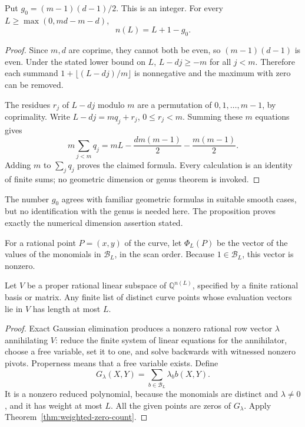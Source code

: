 \begin{proposition}\label{prop:weighted-dimension}
Put $g_0=(m-1)(d-1)/2$.  This is an integer.  For every
$L\ge\max(0,md-m-d)$,
\[
 n(L)=L+1-g_0.
\]
\end{proposition}

\begin{proof}
Since $m,d$ are coprime, they cannot both be even, so
$(m-1)(d-1)$ is even.  Under the stated lower bound on $L$,
$L-dj\ge -m$ for all $j<m$.  Therefore each summand
$1+\lfloor(L-dj)/m\rfloor$ is nonnegative and the maximum with zero
can be removed.

The residues $r_j$ of $L-dj$ modulo $m$ are a permutation of
$0,1,\ldots,m-1$, by coprimality.  Write
$L-dj=mq_j+r_j$, $0\le r_j<m$.  Summing these $m$ equations gives
\[
 m\sum_{j<m}q_j
   =mL-\frac{dm(m-1)}2-\frac{m(m-1)}2.
\]
Adding $m$ to $\sum_jq_j$ proves the claimed formula.
Every calculation is an identity of finite sums; no geometric dimension
or genus theorem is invoked.
\end{proof}

The number $g_0$ agrees with familiar geometric formulas in suitable
smooth cases, but no identification with the genus is needed here.  The
proposition proves exactly the numerical dimension assertion stated.

For a rational point $P=(x,y)$ of the curve, let
$\Phi_L(P)$ be the vector of the values of the monomials in
$\mathcal B_L$, in the scan order.  Because $1\in\mathcal B_L$,
this vector is nonzero.

\begin{corollary}\label{cor:weighted-subspace}
Let $V$ be a proper rational linear subspace of
$\mathbb Q^{n(L)}$, specified by a finite rational basis or matrix.
Any finite list of distinct curve points whose evaluation vectors lie
in $V$ has length at most $L$.
\end{corollary}

\begin{proof}
Exact Gaussian elimination produces a nonzero rational row vector
$\lambda$ annihilating $V$: reduce the finite system of linear
equations for the annihilator, choose a free variable, set it to one,
and solve backwards with witnessed nonzero pivots.  Properness means
that a free variable exists.  Define
\[
 G_\lambda(X,Y)=\sum_{b\in\mathcal B_L}\lambda_b b(X,Y).
\]
It is a nonzero reduced polynomial, because the monomials are distinct
and $\lambda\ne0$, and it has weight at most $L$.  All the given points
are zeros of $G_\lambda$.  Apply
Theorem~\ref{thm:weighted-zero-count}.
\end{proof}

